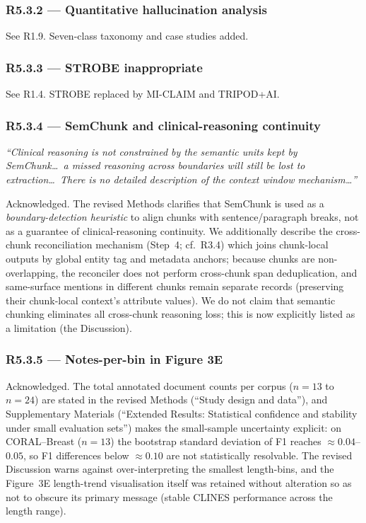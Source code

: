 \documentclass[11pt,letterpaper]{article}
\newcommand{\reviewer}[1]{\par\medskip\textcolor{blue!75!black}{\textit{#1}}\par\medskip}
\newcommand{\response}[1]{\par#1\par\medskip}
\begin{document}
\subsubsection*{R5.3.2 --- Quantitative hallucination analysis}
\response{See R1.9. Seven-class taxonomy and case studies added.}

\subsubsection*{R5.3.3 --- STROBE inappropriate}
\response{See R1.4. STROBE replaced by MI-CLAIM and TRIPOD+AI.}

\subsubsection*{R5.3.4 --- SemChunk and clinical-reasoning continuity}
\reviewer{``Clinical reasoning is not constrained by the semantic units kept by SemChunk\dots\ a missed reasoning across boundaries will still be lost to extraction\dots\ There is no detailed description of the context window mechanism\dots''}
\response{Acknowledged. The revised Methods clarifies that SemChunk is used as a \emph{boundary-detection heuristic} to align chunks with sentence/paragraph breaks, not as a guarantee of clinical-reasoning continuity. We additionally describe the cross-chunk reconciliation mechanism (Step~4; cf.\ R3.4) which joins chunk-local outputs by global entity tag and metadata anchors; because chunks are non-overlapping, the reconciler does not perform cross-chunk span deduplication, and same-surface mentions in different chunks remain separate records (preserving their chunk-local context's attribute values). We do not claim that semantic chunking eliminates all cross-chunk reasoning loss; this is now explicitly listed as a limitation (the Discussion).}

\subsubsection*{R5.3.5 --- Notes-per-bin in Figure 3E}
\response{Acknowledged. The total annotated document counts per corpus ($n=13$ to $n=24$) are stated in the revised Methods (``Study design and data''), and Supplementary Materials (``Extended Results: Statistical confidence and stability under small evaluation sets'') makes the small-sample uncertainty explicit: on CORAL--Breast ($n=13$) the bootstrap standard deviation of F1 reaches $\approx 0.04$--$0.05$, so F1 differences below $\approx 0.10$ are not statistically resolvable. The revised Discussion warns against over-interpreting the smallest length-bins, and the Figure~3E length-trend visualisation itself was retained without alteration so as not to obscure its primary message (stable CLINES performance across the length range).}
\end{document}
